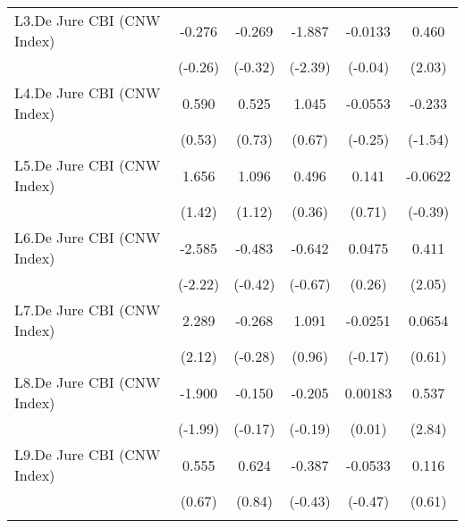 \begin{table}[htbp]
\begin{tabular}{l*{5}{c}}
\addlinespace
L3.De Jure CBI (CNW Index)              &   -0.276         &   -0.269         &   -1.887\sym{*}  &  -0.0133         &    0.460\sym{*}  \\
                                        &  (-0.26)         &  (-0.32)         &  (-2.39)         &  (-0.04)         &   (2.03)         \\
\addlinespace
L4.De Jure CBI (CNW Index)              &    0.590         &    0.525         &    1.045         &  -0.0553         &   -0.233         \\
                                        &   (0.53)         &   (0.73)         &   (0.67)         &  (-0.25)         &  (-1.54)         \\
\addlinespace
L5.De Jure CBI (CNW Index)              &    1.656         &    1.096         &    0.496         &    0.141         &  -0.0622         \\
                                        &   (1.42)         &   (1.12)         &   (0.36)         &   (0.71)         &  (-0.39)         \\
\addlinespace
L6.De Jure CBI (CNW Index)              &   -2.585\sym{*}  &   -0.483         &   -0.642         &   0.0475         &    0.411\sym{*}  \\
                                        &  (-2.22)         &  (-0.42)         &  (-0.67)         &   (0.26)         &   (2.05)         \\
\addlinespace
L7.De Jure CBI (CNW Index)              &    2.289\sym{*}  &   -0.268         &    1.091         &  -0.0251         &   0.0654         \\
                                        &   (2.12)         &  (-0.28)         &   (0.96)         &  (-0.17)         &   (0.61)         \\
\addlinespace
L8.De Jure CBI (CNW Index)              &   -1.900\sym{*}  &   -0.150         &   -0.205         &  0.00183         &    0.537\sym{**} \\
                                        &  (-1.99)         &  (-0.17)         &  (-0.19)         &   (0.01)         &   (2.84)         \\
\addlinespace
L9.De Jure CBI (CNW Index)              &    0.555         &    0.624         &   -0.387         &  -0.0533         &    0.116         \\
                                        &   (0.67)         &   (0.84)         &  (-0.43)         &  (-0.47)         &   (0.61)         \\
\addlinespace

\end{tabular}
\end{table}
